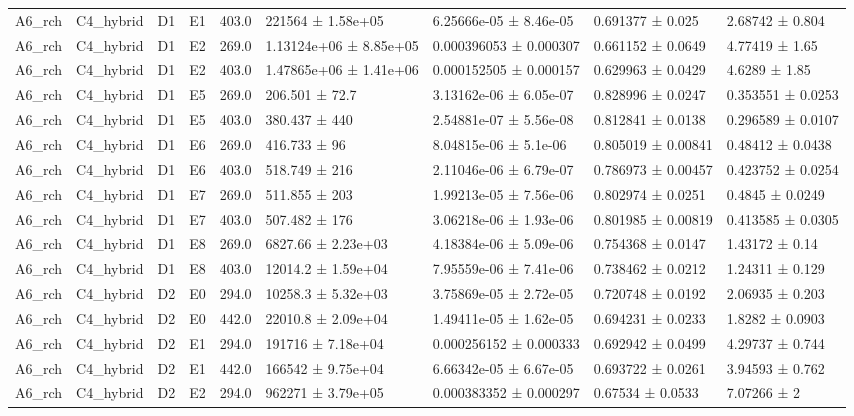 \begin{table}
\begin{tabular}{lllllllll}
A6\_rch & C4\_hybrid & D1 & E1 & 403.0 & 221564 ± 1.58e+05 & 6.25666e-05 ± 8.46e-05 & 0.691377 ± 0.025 & 2.68742 ± 0.804 \\
A6\_rch & C4\_hybrid & D1 & E2 & 269.0 & 1.13124e+06 ± 8.85e+05 & 0.000396053 ± 0.000307 & 0.661152 ± 0.0649 & 4.77419 ± 1.65 \\
A6\_rch & C4\_hybrid & D1 & E2 & 403.0 & 1.47865e+06 ± 1.41e+06 & 0.000152505 ± 0.000157 & 0.629963 ± 0.0429 & 4.6289 ± 1.85 \\
A6\_rch & C4\_hybrid & D1 & E5 & 269.0 & 206.501 ± 72.7 & 3.13162e-06 ± 6.05e-07 & 0.828996 ± 0.0247 & 0.353551 ± 0.0253 \\
A6\_rch & C4\_hybrid & D1 & E5 & 403.0 & 380.437 ± 440 & 2.54881e-07 ± 5.56e-08 & 0.812841 ± 0.0138 & 0.296589 ± 0.0107 \\
A6\_rch & C4\_hybrid & D1 & E6 & 269.0 & 416.733 ± 96 & 8.04815e-06 ± 5.1e-06 & 0.805019 ± 0.00841 & 0.48412 ± 0.0438 \\
A6\_rch & C4\_hybrid & D1 & E6 & 403.0 & 518.749 ± 216 & 2.11046e-06 ± 6.79e-07 & 0.786973 ± 0.00457 & 0.423752 ± 0.0254 \\
A6\_rch & C4\_hybrid & D1 & E7 & 269.0 & 511.855 ± 203 & 1.99213e-05 ± 7.56e-06 & 0.802974 ± 0.0251 & 0.4845 ± 0.0249 \\
A6\_rch & C4\_hybrid & D1 & E7 & 403.0 & 507.482 ± 176 & 3.06218e-06 ± 1.93e-06 & 0.801985 ± 0.00819 & 0.413585 ± 0.0305 \\
A6\_rch & C4\_hybrid & D1 & E8 & 269.0 & 6827.66 ± 2.23e+03 & 4.18384e-06 ± 5.09e-06 & 0.754368 ± 0.0147 & 1.43172 ± 0.14 \\
A6\_rch & C4\_hybrid & D1 & E8 & 403.0 & 12014.2 ± 1.59e+04 & 7.95559e-06 ± 7.41e-06 & 0.738462 ± 0.0212 & 1.24311 ± 0.129 \\
A6\_rch & C4\_hybrid & D2 & E0 & 294.0 & 10258.3 ± 5.32e+03 & 3.75869e-05 ± 2.72e-05 & 0.720748 ± 0.0192 & 2.06935 ± 0.203 \\
A6\_rch & C4\_hybrid & D2 & E0 & 442.0 & 22010.8 ± 2.09e+04 & 1.49411e-05 ± 1.62e-05 & 0.694231 ± 0.0233 & 1.8282 ± 0.0903 \\
A6\_rch & C4\_hybrid & D2 & E1 & 294.0 & 191716 ± 7.18e+04 & 0.000256152 ± 0.000333 & 0.692942 ± 0.0499 & 4.29737 ± 0.744 \\
A6\_rch & C4\_hybrid & D2 & E1 & 442.0 & 166542 ± 9.75e+04 & 6.66342e-05 ± 6.67e-05 & 0.693722 ± 0.0261 & 3.94593 ± 0.762 \\
A6\_rch & C4\_hybrid & D2 & E2 & 294.0 & 962271 ± 3.79e+05 & 0.000383352 ± 0.000297 & 0.67534 ± 0.0533 & 7.07266 ± 2 \\

\end{tabular}
\end{table}
